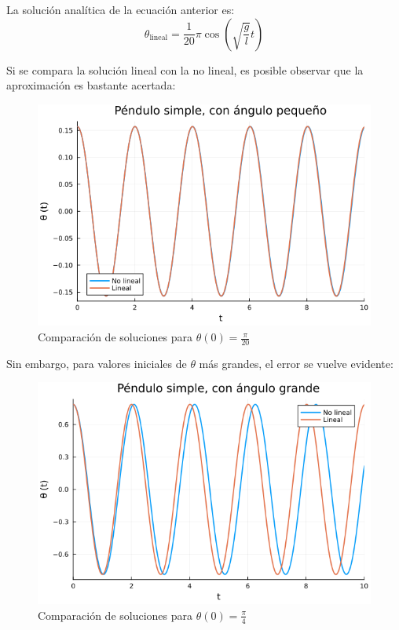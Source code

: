 \begin{ex}
\begin{solution}
        La solución analítica de la ecuación anterior es:
        \[
            \boxed{\theta_{\text{lineal}} = \frac{1}{20} \pi \cos \left( \sqrt{\frac{g}{l}} t \right)}
        \]

    \end{solution}

    Si se compara la solución lineal con la no lineal, es posible
    observar que la aproximación es bastante acertada:

    \begin{figure}[H]
        \centering
        \includegraphics[width=1.0\textwidth]{img/small.png}
        \caption{Comparación de soluciones para $\theta(0) = \frac{\pi}{20}$}
        \label{fig:pendulo_sol_small}
    \end{figure}

    Sin embargo, para valores iniciales de $\theta$ más grandes, el error se
    vuelve evidente:

    \begin{figure}[H]
        \centering
        \includegraphics[width=1.0\textwidth]{img/big.png}
        \caption{Comparación de soluciones para $\theta(0) = \frac{\pi}{4}$}
        \label{fig:pendulo_sol_big}
    \end{figure}


\end{ex}


